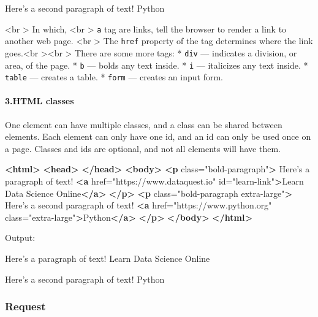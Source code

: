 \documentclass[11pt]{article}
\newenvironment{Shaded}{}{}
\newcommand{\KeywordTok}[1]{\textcolor[rgb]{0.00,0.44,0.13}{\textbf{{#1}}}}
\newcommand{\StringTok}[1]{\textcolor[rgb]{0.25,0.44,0.63}{{#1}}}
\newcommand{\OtherTok}[1]{\textcolor[rgb]{0.00,0.44,0.13}{{#1}}}
\newcommand{\NormalTok}[1]{{#1}}
\begin{document}
Here's a second paragraph of text! Python

 \textless{}br \textgreater{} In which, \textless{}br \textgreater{}
\texttt{a} tag are links, tell the browser to render a link to another
web page. \textless{}br \textgreater{} The \texttt{href} property of the
tag determines where the link goes.\textless{}br
\textgreater{}\textless{}br \textgreater{} There are some more tags: *
\texttt{div} --- indicates a division, or area, of the page. *
\texttt{b} --- bolds any text inside. * \texttt{i} --- italicizes any
text inside. * \texttt{table} --- creates a table. * \texttt{form} ---
creates an input form.

    \hypertarget{html-classes}{%
\paragraph{3.HTML classes}\label{html-classes}}

One element can have multiple classes, and a class can be shared between
elements. Each element can only have one id, and an id can only be used
once on a page. Classes and ids are optional, and not all elements will
have them.

\begin{Shaded}
\begin{Highlighting}[]
\KeywordTok{<html>}
    \KeywordTok{<head>}
    \KeywordTok{</head>}
    \KeywordTok{<body>}
        \KeywordTok{<p}\OtherTok{ class=}\StringTok{"bold-paragraph"}\KeywordTok{>}
\NormalTok{            Here's a paragraph of text!}
            \KeywordTok{<a}\OtherTok{ href=}\StringTok{"https://www.dataquest.io"}\OtherTok{ id=}\StringTok{"learn-link"}\KeywordTok{>}\NormalTok{Learn Data Science Online}\KeywordTok{</a>}
        \KeywordTok{</p>}
        \KeywordTok{<p}\OtherTok{ class=}\StringTok{"bold-paragraph extra-large"}\KeywordTok{>}
\NormalTok{            Here's a second paragraph of text!}
            \KeywordTok{<a}\OtherTok{ href=}\StringTok{"https://www.python.org"}\OtherTok{ class=}\StringTok{"extra-large"}\KeywordTok{>}\NormalTok{Python}\KeywordTok{</a>}
        \KeywordTok{</p>}
    \KeywordTok{</body>}
\KeywordTok{</html>}
\end{Highlighting}
\end{Shaded}

Output:

Here's a paragraph of text! Learn Data Science Online

Here's a second paragraph of text! Python

    \hypertarget{request}{%
\subsubsection{Request}\label{request}}
\end{document}
